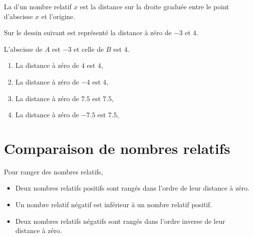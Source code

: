 \begin{definition}
    La  d'un nombre relatif \( x\) est la distance sur la droite graduée entre le point d'abscisse \( x\) et l'origine.
\end{definition}

\begin{example}
    Sur le dessin suivant est représenté la distance à zéro de \( -3\) et \( 4\).
    \begin{center}
        
    \end{center}
    L'abscisse de \( A\) est \( -3\) et celle de \( B\) est \( 4\).
\end{example}

\begin{example}
    \begin{enumerate}
        \item
            La distance à zéro de \( 4\) est \( 4\),
        \item
            La distance à zéro de \( -4\) est \( 4\),
        \item
            La distance à zéro de \( 7.5\) est \( 7.5\),
        \item
            La distance à zéro de \( -7.5 \) est \( 7.5\),
    \end{enumerate}
\end{example}

\section{Comparaison de nombres relatifs}



\begin{Aretenir}
    
    Pour ranger des nombres relatifs,

    \begin{itemize}
        \item 
Deux nombres relatifs positifs sont rangés dans l'ordre de leur distance à zéro.  
\item
Un nombre relatif négatif est inférieur à un nombre relatif positif. 
\item
Deux nombres relatifs négatifs sont rangés dans l'ordre inverse de leur distance à zéro.
    \end{itemize}
\end{Aretenir}

